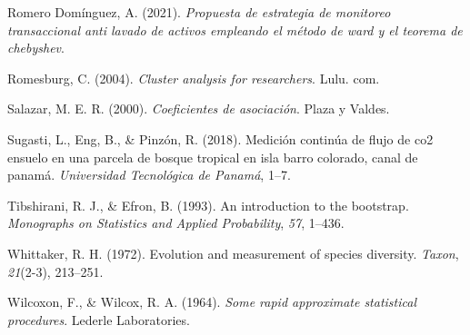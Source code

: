 \documentclass[11pt,]{article}
\begin{document}
\hypertarget{ref-romero2021propuesta}{}
Romero Domínguez, A. (2021). \emph{Propuesta de estrategia de monitoreo
transaccional anti lavado de activos empleando el método de ward y el
teorema de chebyshev}.

\hypertarget{ref-romesburg2004cluster}{}
Romesburg, C. (2004). \emph{Cluster analysis for researchers}. Lulu.
com.

\hypertarget{ref-salazar2000coeficientes}{}
Salazar, M. E. R. (2000). \emph{Coeficientes de asociación}. Plaza y
Valdes.

\hypertarget{ref-sugasti2018medicion}{}
Sugasti, L., Eng, B., \& Pinzón, R. (2018). Medición continúa de flujo
de co2 ensuelo en una parcela de bosque tropical en isla barro colorado,
canal de panamá. \emph{Universidad Tecnológica de Panamá}, 1--7.

\hypertarget{ref-tibshirani1993introduction}{}
Tibshirani, R. J., \& Efron, B. (1993). An introduction to the
bootstrap. \emph{Monographs on Statistics and Applied Probability},
\emph{57}, 1--436.

\hypertarget{ref-whittaker1972evolution}{}
Whittaker, R. H. (1972). Evolution and measurement of species diversity.
\emph{Taxon}, \emph{21}(2-3), 213--251.

\hypertarget{ref-wilcoxon1964some}{}
Wilcoxon, F., \& Wilcox, R. A. (1964). \emph{Some rapid approximate
statistical procedures}. Lederle Laboratories.




\newpage
\singlespacing 
\end{document}
